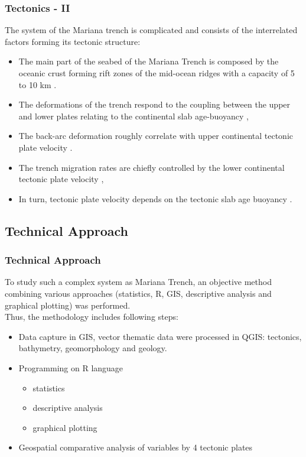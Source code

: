 \documentclass[pdflatex,compress,8pt,
	xcolor={dvipsnames,dvipsnames,svgnames,x11names,table},
	hyperref={colorlinks = true,breaklinks = true, urlcolor = NavyBlue, breaklinks = true}]{beamer}
\begin{document}
\begin{frame}\frametitle{Tectonics - II}
The system of the Mariana trench is complicated and consists of the interrelated factors forming its tectonic structure:
 \begin{itemize}
            \item The main part of the seabed of the Mariana Trench is composed by the oceanic crust forming rift zones of the mid-ocean ridges with a capacity of 5 to 10 km \cite{Morgan1968}. 
            \item The deformations of the trench respond to the coupling between the upper and lower plates relating to the continental slab age-buoyancy \cite{RuffKanamori1980},
            \item The back-arc deformation roughly correlate with upper continental tectonic plate velocity \cite{HeuretLallemand2005}. 
            \item The trench migration rates are chiefly controlled by the lower continental tectonic plate velocity \cite{Lallemandetal2008}, 
            \item In turn, tectonic plate velocity depends on the tectonic slab age buoyancy \cite{Chase1978}.
\end{itemize}
\end{frame}

\subsection{Technical Approach}
\begin{frame}\frametitle{Technical Approach}
To study such a complex system as Mariana Trench, an objective method combining various approaches (statistics, R, GIS, descriptive analysis and graphical plotting) was performed. \\Thus, the methodology includes following steps:
\begin{itemize}
    \item Data capture in GIS, vector thematic data were processed in QGIS: tectonics, bathymetry, geomorphology and geology.
    \item Programming on R language
      \begin{itemize}
            \item statistics
            \item descriptive analysis 
            \item graphical plotting  
        \end{itemize}
      \item Geospatial comparative analysis of variables by 4 tectonic plates
\end{itemize}
\end{frame}
\end{document}
